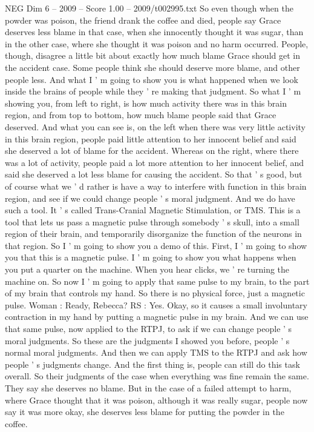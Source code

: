 \begin{textsample}{NEG Dim 6 – 2009 – Score 1.00 – 2009/t002995.txt}
So even though when the powder was poison, the friend drank the coffee and died, people say Grace deserves less blame in that case, when she innocently thought it was sugar, than in the other case, where she thought it was poison and no harm occurred.
People, though, disagree a little bit about exactly how much blame Grace should get in the accident case.
Some people think she should deserve more blame, and other people less.
And what I ' m going to show you is what happened when we look inside the brains of people while they ' re making that judgment.
So what I ' m showing you, from left to right, is how much activity there was in this brain region, and from top to bottom, how much blame people said that Grace deserved.
And what you can see is, on the left when there was very little activity in this brain region, people paid little attention to her innocent belief and said she deserved a lot of blame for the accident.
Whereas on the right, where there was a lot of activity, people paid a lot more attention to her innocent belief, and said she deserved a lot less blame for causing the accident.
So that ' s good, but of course what we ' d rather is have a way to interfere with function in this brain region, and see if we could change people ' s moral judgment.
And we do have such a tool.
It ' s called Trans-Cranial Magnetic Stimulation, or TMS.
This is a tool that lets us pass a magnetic pulse through somebody ' s skull, into a small region of their brain, and temporarily disorganize the function of the neurons in that region.
So I ' m going to show you a demo of this.
First, I ' m going to show you that this is a magnetic pulse.
I ' m going to show you what happens when you put a quarter on the machine.
When you hear clicks, we ' re turning the machine on.
So now I ' m going to apply that same pulse to my brain, to the part of my brain that controls my hand.
So there is no physical force, just a magnetic pulse.
Woman : Ready, Rebecca?
RS : Yes.
Okay, so it causes a small involuntary contraction in my hand by putting a magnetic pulse in my brain.
And we can use that same pulse, now applied to the RTPJ, to ask if we can change people ' s moral judgments.
So these are the judgments I showed you before, people ' s normal moral judgments.
And then we can apply TMS to the RTPJ and ask how people ' s judgments change.
And the first thing is, people can still do this task overall.
So their judgments of the case when everything was fine remain the same.
They say she deserves no blame.
But in the case of a failed attempt to harm, where Grace thought that it was poison, although it was really sugar, people now say it was more okay, she deserves less blame for putting the powder in the coffee.

\end{textsample}
